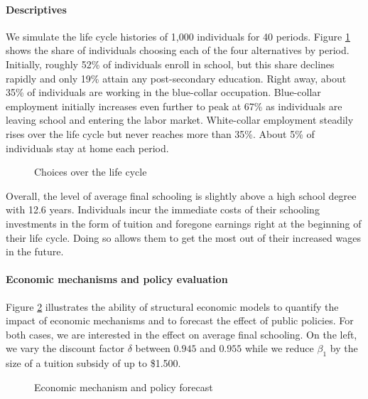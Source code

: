 \paragraph{Descriptives} We simulate the life cycle histories of 1,000 individuals for 40 periods. Figure \ref{Choices over the life cycle} shows the share of individuals choosing each of the four alternatives by period. Initially, roughly 52\% of individuals enroll in school, but this share declines rapidly and only 19\% attain any post-secondary education. Right away, about 35\% of individuals are working in the blue-collar occupation.  Blue-collar employment initially increases even further to peak at 67\% as individuals are leaving school and entering the labor market. White-collar employment steadily rises over the life cycle but never reaches more than 35\%. About 5\% of individuals stay at home each period.

\begin{figure}[ht!]\centering
\caption{Choices over the life cycle}\label{Choices over the life cycle}
\end{figure}\FloatBarrier

\noindent Overall, the level of average final schooling is slightly above a high school degree with 12.6 years. Individuals incur the immediate costs of their schooling investments in the form of tuition and foregone earnings right at the beginning of their life cycle. Doing so allows them to get the most out of their increased wages in the future.

\paragraph{Economic mechanisms and policy evaluation} Figure \ref{Economic mechanism and policy forecast} illustrates the ability of structural economic models to quantify the impact of economic mechanisms and to forecast the effect of public policies. For both cases, we are interested in the effect on average final schooling. On the left, we vary the discount factor $\delta$ between $0.945$ and $0.955$ while we reduce $\beta_1$ by the size of a tuition subsidy of up to \$1.500.

\begin{figure}[h!]\centering
\caption{Economic mechanism and policy forecast}\label{Economic mechanism and policy forecast}
\hspace{0.3cm}
\end{figure}\FloatBarrier

